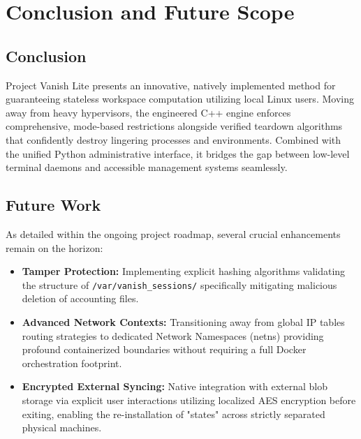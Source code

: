 \chapter{Conclusion and Future Scope}

\section{Conclusion}
Project Vanish Lite presents an innovative, natively implemented method for guaranteeing stateless workspace computation utilizing local Linux users. Moving away from heavy hypervisors, the engineered C++ engine enforces comprehensive, mode-based restrictions alongside verified teardown algorithms that confidently destroy lingering processes and environments. Combined with the unified Python administrative interface, it bridges the gap between low-level terminal daemons and accessible management systems seamlessly.

\section{Future Work}
As detailed within the ongoing project roadmap, several crucial enhancements remain on the horizon:
\begin{itemize}
    \item \textbf{Tamper Protection:} Implementing explicit hashing algorithms validating the structure of \texttt{/var/vanish\_sessions/} specifically mitigating malicious deletion of accounting files.
    \item \textbf{Advanced Network Contexts:} Transitioning away from global IP tables routing strategies to dedicated Network Namespaces (netns) providing profound containerized boundaries without requiring a full Docker orchestration footprint.
    \item \textbf{Encrypted External Syncing:} Native integration with external blob storage via explicit user interactions utilizing localized AES encryption before exiting, enabling the re-installation of "states" across strictly separated physical machines.
\end{itemize}
